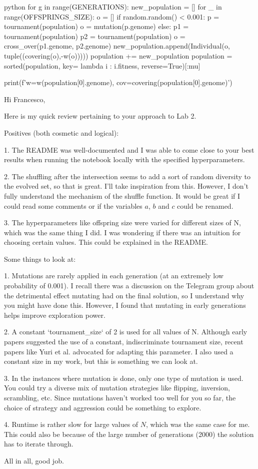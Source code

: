 \begin{mintedbox}{python}
  for g in range(GENERATIONS):
      new_population = []
      for _ in range(OFFSPRINGS_SIZE):
          o = []
          if random.random() < 0.001:
              p = tournament(population)
              o = mutation(p.genome)
          else:
              p1 = tournament(population)
              p2 = tournament(population)
              o = cross_over(p1.genome, p2.genome)
          new_population.append(Individual(o, tuple((covering(o),-w(o)))))
      population += new_population
      population = sorted(population, key= lambda i : i.fitness, reverse=True)[:mu]

  print(f'w={w(population[0].genome)}, cov={covering(population[0].genome)}')
\end{mintedbox}

Hi Francesco,

Here is my quick review pertaining to your approach to Lab 2.

Positives (both cosmetic and logical):

1. The README was well-documented and I was able to come close to your best results when running the notebook locally with the specified hyperparameters.

2. The shuffling after the intersection seems to add a sort of random diversity to the evolved set, so that is great. I'll take inspiration from this. However, I don't fully understand the mechanism of the shuffle function. It would be great if I could read some comments or if the variables $a$, $b$ and $c$ could be renamed.

3. The hyperparameters like offspring size were varied for different sizes of N, which was the same thing I did. I was wondering if there was an intuition for choosing certain values. This could be explained in the README.

Some things to look at:

1. Mutations are rarely applied in each generation (at an extremely low probability of 0.001). I recall there was a discussion on the Telegram group about the detrimental effect mutating had on the final solution, so I understand why you might have done this. However, I found that mutating in early generations helps improve exploration power.

2. A constant `tournament\_size` of 2 is used for all values of N. Although early papers suggested the use of a constant, indiscriminate tournament size, recent papers like Yuri et al. advocated for adapting this parameter. I also used a constant size in my work, but this is something we can look at.

3. In the instances where mutation is done, only one type of mutation is used. You could try a diverse mix of mutation strategies like flipping, inversion, scrambling, etc. Since mutations haven't worked too well for you so far, the choice of strategy and aggression could be something to explore.

4. Runtime is rather slow for large values of $N$, which was the same case for me. This could also be because of the large number of generations (2000) the solution has to iterate through.

All in all, good job.
